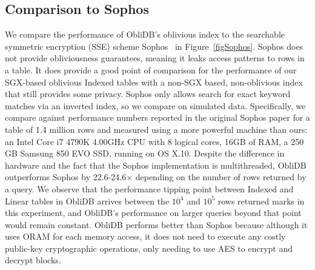 \documentclass[letterpaper,twocolumn,10pt]{article}
\def\name/{ObliDB}
\begin{document}
\subsection{Comparison to Sophos}
We compare the performance of \name/'s oblivious index to the searchable symmetric encryption (SSE) scheme Sophos~\cite{Bost16} in Figure~\ref{figSophos}. Sophos does not provide obliviousness guarantees, meaning it leaks access patterns to rows in a table. It does provide a good point of comparison for the performance of our SGX-based oblivious Indexed tables with a non-SGX based, non-oblivious index that still provides some privacy. Sophos only allows search for exact keyword matches via an inverted index, so we compare on simulated data. Specifically, we compare against performance numbers reported in the original Sophos paper for a table of 1.4 million rows and measured using a more powerful machine than ours: an Intel Core i7 4790K 4.00GHz CPU with 8 logical cores, 16GB of RAM, a 250 GB Samsung 850 EVO SSD, running on OS X.10. Despite the difference in hardware and the fact that the Sophos implementation is multithreaded, \name/ outperforms Sophos by 22.6-24.6$\times$ depending on the number of rows returned by a query. We observe that the performance tipping point between Indexed and Linear tables in \name/ arrives between the $10^4$ and $10^5$ rows returned marks in this experiment, and \name/'s performance on larger queries beyond that point would remain constant. \name/ performs better than Sophos because although it uses ORAM for each memory access, it does not need to execute any costly public-key cryptographic operations, only needing to use AES to encrypt and decrypt blocks. 
\end{document}
